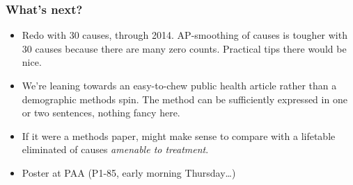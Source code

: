 \documentclass[20pt]{beamer}
\begin{document}
\begin{frame}
\frametitle{What's next?}
\begin{itemize}
\item Redo with 30 causes, through 2014. AP-smoothing of causes is tougher with
30 causes because there are many zero counts. Practical tips there would be
nice.
\item We're leaning towards an easy-to-chew public health article rather than a
demographic methods spin. The method can be sufficiently expressed in
one or two sentences, nothing fancy here.
\item If it were a methods paper, might make sense to compare with a lifetable
eliminated of causes \textit{amenable to treatment}.
\item Poster at PAA (P1-85, early morning Thursday\ldots)
\end{itemize}
\end{frame}
\end{document}
